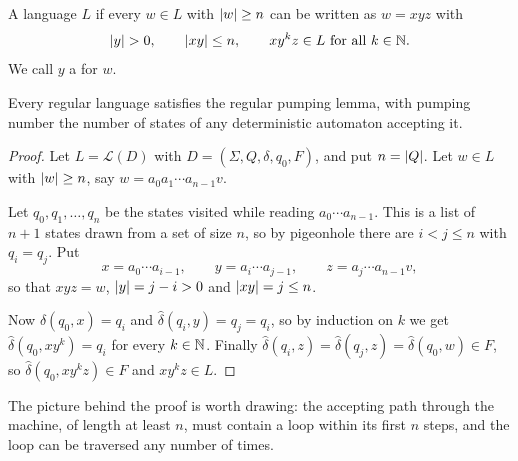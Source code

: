 \documentclass[a4paper]{scrartcl}
\newcommand{\lang}{\mathcal{L}}
\newcommand{\initarr}[2]{\draw[tra] ($(#1)+#2$) -- (#1);}
\begin{document}
\begin{definition}
	A language $L$  if every $w \in L$ with $\lvert w\rvert \geq n$ can be written as $w = xyz$ with
	$$\lvert y\rvert > 0, \qquad \lvert xy\rvert \leq n, \qquad xy^kz \in L \text{ for all } k \in \mathbb{N}.$$
	We call $y$ a  for $w$.
\end{definition}

\begin{theorem}\label{thm:regpumping}
	Every regular language satisfies the regular pumping lemma, with pumping number the number of states of any deterministic automaton accepting it.
\end{theorem}

\begin{proof}
	Let $L = \lang(D)$ with $D = (\Sigma, Q, \delta, q_0, F)$, and put $n = \lvert Q\rvert$. Let $w \in L$ with $\lvert w\rvert \geq n$, say $w = a_0a_1\cdots a_{n-1}v$.

	Let $q_0, q_1, \dots, q_n$ be the states visited while reading $a_0 \cdots a_{n-1}$. This is a list of $n+1$ states drawn from a set of size $n$, so by pigeonhole there are $i < j \leq n$ with $q_i = q_j$. Put
	$$x = a_0\cdots a_{i-1}, \qquad y = a_i \cdots a_{j-1}, \qquad z = a_j \cdots a_{n-1}v,$$
	so that $xyz = w$, $\lvert y\rvert = j - i > 0$ and $\lvert xy\rvert = j \leq n$.

	Now $\hat\delta(q_0, x) = q_i$ and $\hat\delta(q_i, y) = q_j = q_i$, so by induction on $k$ we get $\hat\delta(q_0, xy^k) = q_i$ for every $k \in \mathbb{N}$. Finally $\hat\delta(q_i, z) = \hat\delta(q_j, z) = \hat\delta(q_0,w) \in F$, so $\hat\delta(q_0, xy^kz) \in F$ and $xy^kz \in L$.
\end{proof}

The picture behind the proof is worth drawing: the accepting path through the machine, of length at least $n$, must contain a loop within its first $n$ steps, and the loop can be traversed any number of times.

\begin{center}
\end{center}
\end{document}
